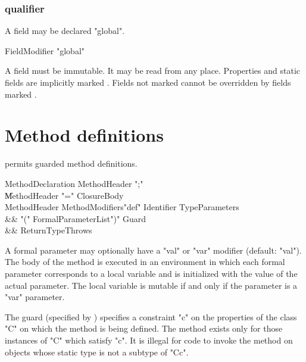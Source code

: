 \subsubsection{ qualifier}
\label{GlobalField}

A field may be declared \xcd"global".

\begin{grammar}
  FieldModifier \: \xcd"global"  
\end{grammar}

A  field must be immutable. It may be read from any place.
Properties and static fields are implicitly marked .
Fields not marked  cannot be overridden by fields marked
.

\section{Method definitions}

\Xten{} permits guarded method definitions. 

\begin{grammar}
MethodDeclaration \: MethodHeader \xcd";" \\
                  \| MethodHeader \xcd"=" ClosureBody \\
MethodHeader \:  
  MethodModifiers\opt \xcd"def" Identifier TypeParameters\opt \\
&& \xcd"(" 
  FormalParameterList\opt \xcd")" Guard\opt \\
  && ReturnType\opt Throws\opt \\
\end{grammar}

A formal parameter may optionally have a \xcd"val" or \xcd"var"
modifier (default: \xcd"val").  
The body of the method is executed in an environment in which 
each formal parameter corresponds to a local variable
and is initialized with the value of the actual parameter.
The local variable  is mutable if and only if the
parameter is a \xcd"var" parameter.

\label{MethodGuard}

The guard (specified by )
specifies a constraint \xcd"c" on the
properties of the class \xcd"C" on which the method is being defined. The
method exists only for those instances of \xcd"C" which satisfy \xcd"c".  It is
illegal for code to invoke the method on objects whose static type is
not a subtype of \xcd"C{c}".

